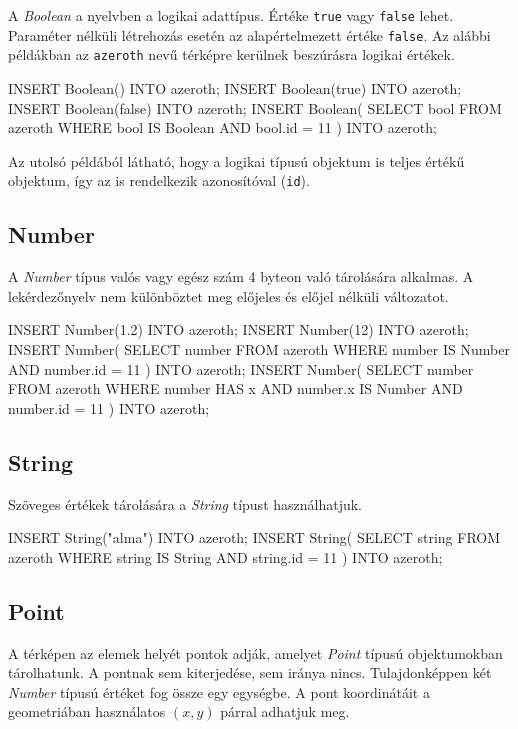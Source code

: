 A \textit{Boolean} a nyelvben a logikai adattípus. Értéke \texttt{true} vagy \texttt{false} lehet. Paraméter nélküli létrehozás esetén az alapértelmezett értéke \texttt{false}. Az alábbi példákban az \texttt{azeroth} nevű térképre kerülnek beszúrásra logikai értékek.

\begin{sql}
INSERT Boolean() INTO azeroth;
INSERT Boolean(true) INTO azeroth; 
INSERT Boolean(false) INTO azeroth;
INSERT Boolean(
    { SELECT bool FROM azeroth
      WHERE bool IS Boolean AND bool.id = 11 }
) INTO azeroth;
\end{sql}

Az utolsó példából látható, hogy a logikai típusú objektum is teljes értékű objektum, így az is rendelkezik azonosítóval (\texttt{id}).

\subsection{Number}

A \textit{Number} típus valós vagy egész szám 4 byteon való tárolására alkalmas. A lekérdezőnyelv nem különböztet meg előjeles és előjel nélküli változatot.

\begin{sql}
INSERT Number(1.2) INTO azeroth;
INSERT Number(12) INTO azeroth;
INSERT Number(
    { SELECT number FROM azeroth
      WHERE number IS Number AND number.id = 11 }
) INTO azeroth;
INSERT Number(
    { SELECT number FROM azeroth
      WHERE number HAS x AND number.x IS Number AND number.id = 11 }
) INTO azeroth;
\end{sql}

\subsection{String}

Szöveges értékek tárolására a \textit{String} típust használhatjuk.

\begin{sql}
INSERT String("alma") INTO azeroth;
INSERT String(
    { SELECT string FROM azeroth
      WHERE string IS String AND string.id = 11 }
)
INTO azeroth;
\end{sql}

\subsection{Point}

A térképen az elemek helyét pontok adják, amelyet \textit{Point} típusú objektumokban tárolhatunk. A pontnak sem kiterjedése, sem iránya nincs. Tulajdonképpen két \textit{Number} típusú értéket fog össze egy egységbe. A pont koordinátáit a geometriában használatos $(x, y)$ párral adhatjuk meg.


